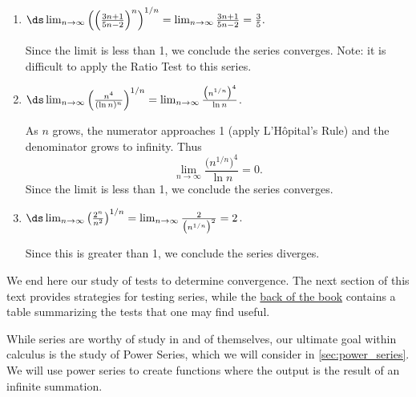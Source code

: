{\begin{enumerate}
	\item	$\ds\lim_{n\to\infty} \left(\left(\frac{3n+1}{5n-2}\right)^n\right)^{1/n} = \lim_{n\to\infty} \frac{3n+1}{5n-2} = \frac 35.$ 
	
	Since the limit is less than 1, we conclude the series converges. Note: it is difficult to apply the Ratio Test to this series.
	
	\item	$\ds\lim_{n\to\infty} \left(\frac{n^4}{(\ln n)^n}\right)^{1/n} = \lim_{n\to\infty} \frac {\big(n^{1/n}\big)^4}{\ln n}  $. 
	
	As $n$ grows, the numerator approaches 1 (apply L'H\^opital's Rule) and the denominator grows to infinity.  Thus
	\[\lim_{n\to\infty} \frac{\big(n^{1/n}\big)^4}{\ln n} = 0.\]
	Since the limit is less than 1, we conclude the series converges.
	
	\item	$\ds \lim_{n\to\infty} \left(\frac{2^n}{n^2}\right)^{1/n} = \lim_{n\to\infty} \frac{2}{\big(n^{1/n}\big)^2} = 2$. 
	
	Since this is greater than 1, we conclude the series diverges.\eoehere
\end{enumerate}}

We end here our study of tests to determine convergence. The next section of this text provides strategies for testing series, while the \hyperref[tab_series_tests]{back of the book} contains a table summarizing the tests that one may find useful. 

While series are worthy of study in and of themselves, our ultimate goal within calculus is the study of Power Series, which we will consider in \autoref{sec:power_series}. We will use power series to create functions where the output is the result of an infinite summation. %

